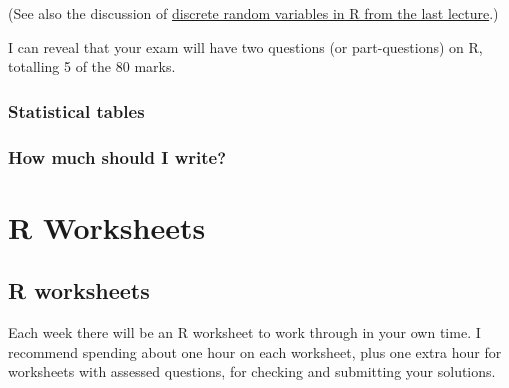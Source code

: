 \documentclass[
  letterpaper,
]{report}
\theoremstyle{definition}
\theoremstyle{definition}
\theoremstyle{remark}
\begin{document}
(See also the discussion of \protect\hyperlink{faq-R-RV}{discrete random
variables in R from the last lecture}.)

I can reveal that your exam will have two questions (or part-questions)
on R, totalling 5 of the 80 marks.

\hypertarget{statistical-tables-1}{%
\subsection{Statistical tables}\label{statistical-tables-1}}

\hypertarget{how-much-should-i-write}{%
\subsection{How much should I write?}\label{how-much-should-i-write}}

\hypertarget{R}{%
\chapter*{R Worksheets}\label{R}}


\hypertarget{r-work}{%
\section*{R worksheets}\label{r-work}}


Each week there will be an R worksheet to work through in your own time.
I recommend spending about one hour on each worksheet, plus one extra
hour for worksheets with assessed questions, for checking and submitting
your solutions.
\end{document}
